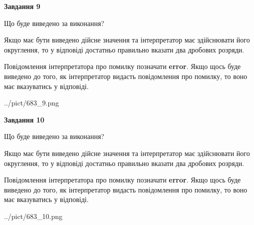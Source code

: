 \documentclass[12pt, ukrainian]{article}
\begin{document}
{\begin {Large}
{\begin {center}\textbf{Завдання 9}\end {center}}\par
Що буде виведено за виконання? \par

Якщо має бути виведено дійсне значення та інтерпретатор має здійснювати його округлення, 
то у відповіді достатньо правильно вказати два дробових розряди.

Повідомлення інтерпретатора про помилку позначати \textbf{error}.
Якщо щось буде виведено до того, як інтерпретатор видасть повідомлення про помилку, 
то воно має вказуватись у відповіді. \par

\begin{center}
	{../pict/683_9.png}
\end{center}
\newpage

{\begin {center}\textbf{Завдання 10}\end {center}}\par
Що буде виведено за виконання? \par

Якщо має бути виведено дійсне значення та інтерпретатор має здійснювати його округлення, 
то у відповіді достатньо правильно вказати два дробових розряди.

Повідомлення інтерпретатора про помилку позначати \textbf{error}.
Якщо щось буде виведено до того, як інтерпретатор видасть повідомлення про помилку, 
то воно має вказуватись у відповіді. \par

\begin{center}
	{../pict/683_10.png}
\end{center}
\newpage

\end {Large}}
\end{document}
